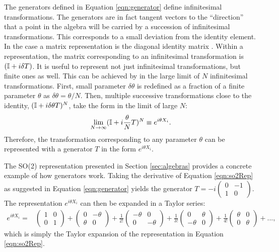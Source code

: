 The generators defined in Equation \ref{eqn:generator} define infinitesimal transformations.
The generators are in fact tangent vectors to the ``direction'' that a point in the algebra will be carried by a succession of infinitesimal transformations.
This corresponds to a small deviation from the identity element. In the case a matrix representation is the diagonal identity matrix \ident.
Within a representation, the matrix corresponding to an infinitesimal transformation is $(\mathbb{I}+i\delta T)$.
It is useful to represent not just infinitesimal transformations, but finite ones as well.
This can be achieved by in the large limit of $N$ infinitesimal transformations.
First, small parameter $\delta\theta$ is redefined as a fraction of a finite parameter $\theta$ as $\delta\theta=\theta/N$.
Then, multiple successive transformations close to the identity, $(\mathbb{I}+i\delta\theta T)^N$, take the form in the limit of large $N$:
\begin{equation}\begin{split}
\lim_{N\to\infty}(\mathbb{I}+i\frac{\theta}{N}T)^N\equiv e^{i\theta X_i}. \\
\end{split}\end{equation}
Therefore, the transformation corresponding to any parameter $\theta$ can be represented with a generator $T$ in the form $e^{i\theta X_i}$.

The SO(2) representation presented in Section \ref{sec:algebras} provides a concrete example of how generators work.
Taking the derivative of Equation \ref{eqn:so2Rep} as suggested in Equation \ref{eqn:generator} yields the generator $T=-i\begin{pmatrix}0&-1\\1&0\end{pmatrix}$.
The representation $e^{i\theta X_i}$ can then be expanded in a Taylor series:
\begin{equation}\begin{split}
e^{i\theta X_i} = & 
            \begin{pmatrix}1&0\\0&1\end{pmatrix} +  %
            \begin{pmatrix}0&-\theta\\\theta&0\end{pmatrix} +  %
            \frac{1}{2!}\begin{pmatrix}-\theta&0\\0&-\theta\end{pmatrix} + %
            \frac{1}{3!}\begin{pmatrix}0&\theta\\-\theta&0\end{pmatrix} + %
            \frac{1}{4!}\begin{pmatrix}\theta&0\\0&\theta\end{pmatrix} + ..., %
\end{split}\end{equation}
which is simply the Taylor expansion of the representation in Equation \ref{eqn:so2Rep}.

